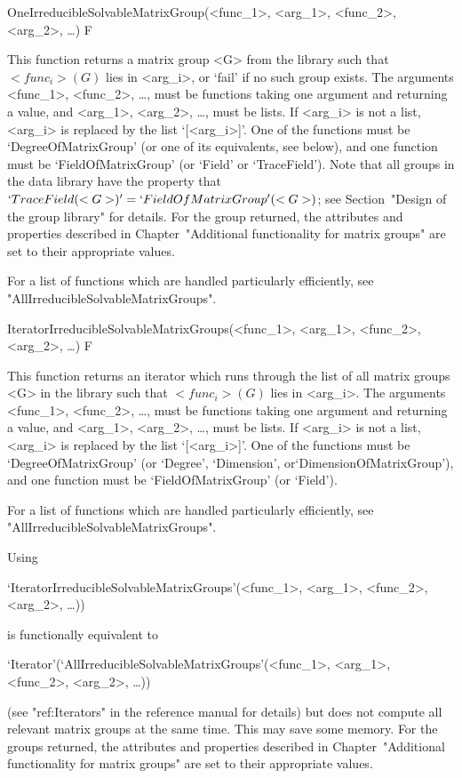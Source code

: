 \>OneIrreducibleSolvableMatrixGroup(<func_1>, <arg_1>, <func_2>, <arg_2>, \dots) F

This function returns a matrix group <G> from the {\IRREDSOL} library such that
$<func_i>(G)$ lies in <arg_i>, or `fail' if no such group exists. The arguments <func_1>,
<func_2>, \dots, must be {\GAP} functions taking one argument and returning a value, and
<arg_1>, <arg_2>, \dots,  must be lists. If <arg_i> is not a list, <arg_i> is replaced by
the list `[<arg_i>]'. One of the functions must be `DegreeOfMatrixGroup' (or one of its
equivalents, see below), and one function must be  `FieldOfMatrixGroup' (or `Field' or 
`TraceField'). Note that all groups in the data library have the property that 
$`TraceField(<G>)' = `FieldOfMatrixGroup'(<G>)$; see Section~"Design of the group library" 
for details. 
For the group returned, the attributes and properties described in 
Chapter~"Additional functionality for matrix groups" are set to their appropriate values.

For a list of functions which are handled particularly efficiently, see
"AllIrreducibleSolvableMatrixGroups".

\>IteratorIrreducibleSolvableMatrixGroups(<func_1>, <arg_1>, <func_2>, <arg_2>, \dots) F

This function returns an iterator which runs through the list of all matrix groups <G>
in the  {\IRREDSOL} library such that
$<func_i>(G)$ lies in <arg_i>. The arguments <func_1>, <func_2>, \dots,
must be {\GAP} functions taking one argument and returning a value, and <arg_1>, <arg_2>, \dots, 
must be lists. If <arg_i> is not a list, <arg_i> is replaced by the list `[<arg_i>]'.
One of the functions must be `DegreeOfMatrixGroup' (or `Degree', `Dimension', 
or`DimensionOfMatrixGroup'), and one
function must be  `FieldOfMatrixGroup' (or `Field'). 

For a list of functions which are handled particularly efficiently, see
"AllIrreducibleSolvableMatrixGroups".

Using 

`IteratorIrreducibleSolvableMatrixGroups'(<func_1>, <arg_1>, <func_2>, <arg_2>, \dots)) 

is functionally equivalent to 

`Iterator'(`AllIrreducibleSolvableMatrixGroups'(<func_1>, <arg_1>, <func_2>, <arg_2>, \dots))

(see "ref:Iterators" in the {\GAP} reference manual for details) but does not compute all 
relevant matrix groups at the same time. This may save some memory. 
For the groups returned, the attributes and properties described in
Chapter~"Additional functionality for matrix groups" are set to their appropriate values.


